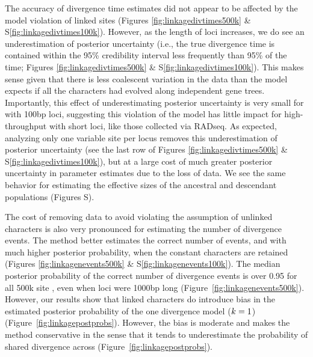 The accuracy of divergence time estimates did not appear to be affected by the
model violation of linked sites
(Figures \ref{fig:linkagedivtimes500k}
\&
S\ref{fig:linkagedivtimes100k}).
However,
as the length of loci increases, we do see an underestimation
of posterior uncertainty (i.e., the 
true divergence time is contained within the 95\% credibility interval 
less frequently than 95\% of the time;
Figures \ref{fig:linkagedivtimes500k}
\&
S\ref{fig:linkagedivtimes100k}).
This makes sense given that there is less coalescent variation in the data than
the model expects if all the characters had evolved along independent gene
trees.
Importantly, this effect of underestimating posterior uncertainty is very small
for \datasets with 100bp loci, suggesting this violation of the model has little
impact for high-throughput \datasets with short loci, like those collected via
RADseq.
As expected, analyzing only one variable site per locus removes this underestimation
of posterior uncertainty
(see the last row of Figures \ref{fig:linkagedivtimes500k}
\&
S\ref{fig:linkagedivtimes100k}),
but at a large cost of much greater posterior uncertainty in parameter
estimates due to the loss of data.
We see the same behavior for estimating the effective sizes of the ancestral
and descendant populations
(Figures S).

The cost of removing data to avoid violating the assumption of unlinked
characters is also very pronounced for estimating the number of divergence
events.
The method better estimates the correct number of events, and with much higher
posterior probability, when the constant characters are retained 
(Figures
\ref{fig:linkagenevents500k}
\&
S\ref{fig:linkagenevents100k}).
The median posterior probability of the correct number of divergence events is
over 0.95 for all 500k site \datasets, even when loci were 1000bp long
(Figure~\ref{fig:linkagenevents500k}).
However, our results show that linked characters do introduce bias in the
estimated posterior probability of the one divergence model ($k_{}{} = 1$)
(Figure~\ref{fig:linkagepostprobs}).
However, the bias is moderate and makes the method conservative in the
sense that it tends to underestimate the probability of shared
divergence across \datasets (Figure~\ref{fig:linkagepostprobs}).

